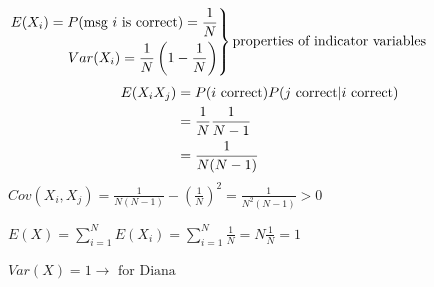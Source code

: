 $
    \left.\begin{aligned}
        E(X_i)=P(\text{msg $ i $ is correct})=\frac{1}{N} \\
        Var(X_i)=\frac{1}{N}\left( 1-\frac{1}{N} \right)
    \end{aligned}\right\}\text{properties of indicator variables}
$
\begin{align*}
    E(X_i X_j)
     & =P(\text{$ i $ correct})P(\text{$ j $ correct}|\text{$ i $ correct}) \\
     & =\frac{1}{N}\frac{1}{N-1}                                            \\
     & =\frac{1}{N(N-1)}
\end{align*}
$ Cov(X_i,X_j)=\frac{1}{N(N-1)}-\left( \frac{1}{N} \right)^2=
    \frac{1}{N^2(N-1)} >0$

$ E(X)=\sum\limits_{i=1}^{N} E(X_i)=\sum\limits_{i=1}^{N}\frac{1}{N}
    =N\frac{1}{N}=1 $

$ Var(X)=1\rightarrow\text{ for Diana} $

